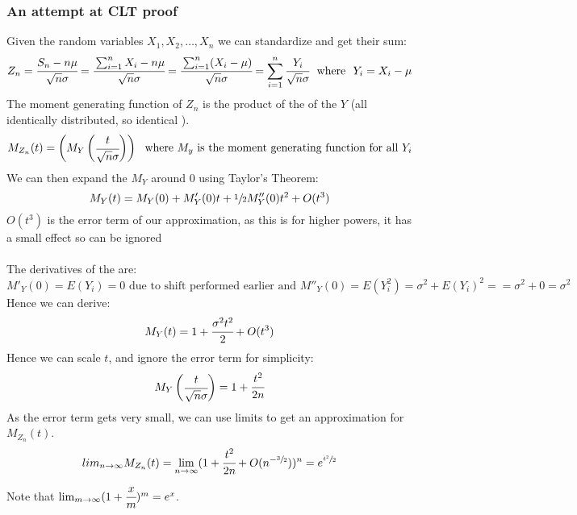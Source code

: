 \documentclass{report}
\begin{document}
            \subsubsection*{An attempt at CLT proof}
                Given the random variables $X_1, X_2, \dots, X_n$ we can standardize and get their sum:
                \[Z_n = \cfrac{S_n - n \mu}{\sqrt{n} \sigma} = \cfrac{\sum_{i=1}^nX_i - n\mu}{\sqrt{n} \sigma} = \cfrac{\sum_{i=1}^n(X_i - \mu)}{\sqrt{n} \sigma} = \sum_{i=1}^n \cfrac{Y_i}{\sqrt{n}\sigma} \ \text{ where } \ Y_i = X_i - \mu\]
                The moment generating function of $Z_n$ is the product of the  of the $Y$ (all identically distributed, so identical ).
                \[M_{Z_n}(t) = \begin{pmatrix}
                    M_Y \begin{pmatrix}
                        \cfrac{t}{\sqrt{n}\sigma}
                    \end{pmatrix}
                \end{pmatrix} \ \text{ where } M_y \text{ is the moment generating function for all } Y_i\]
                We can then expand the $M_Y$ around 0 using Taylor's Theorem:
                \[M_Y(t) = M_Y(0) + M'_Y(0)t + \sfrac{1}{2}M''_Y(0)t^2 + O(t^3)\]
                $O(t^3)$ is the error term of our approximation, as this is for higher powers, it has a small effect so can be ignored
                \\
                \\ The derivatives of the  are:
                \[M'_Y(0) = E(Y_i) = 0 \text{ due to shift performed earlier and } M''_Y(0) = E(Y_i^2) = \sigma^2 + E(Y_i)^2 = = \sigma^2 + 0 = \sigma^2\]
                Hence we can derive:
                \[M_Y(t) = 1 + \cfrac{\sigma^2t^2}{2} + O(t^3)\]
                Hence we can scale $t$, and ignore the error term for simplicity:
                \[M_Y \begin{pmatrix}
                    \cfrac{t}{\sqrt{n}\sigma}
                \end{pmatrix} = 1 + \cfrac{t^2}{2n}\]
                As the error term gets very small, we can use limits to get an approximation for $M_{Z_n}(t)$.
                \[lim_{n \to \infty} M_{Z_n}(t) = \lim_{n \to \infty}(1 + \cfrac{t^2}{2n} + O(n^{-\sfrac{3}{2}}))^n = e^{\sfrac{t^2}{2}}\]
                Note that $\lim_{m \to \infty}(1 + \cfrac{x}{m})^m = e^x$.
\end{document}
